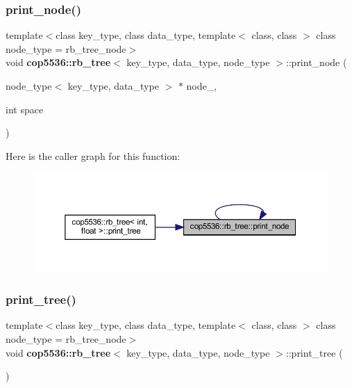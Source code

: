 \mbox{\label{classcop5536_1_1rb__tree_a81f5e4b5a9189799bbc0badcc6ecdc93}} 
\subsubsection{print\_node()}
{\footnotesize\ttfamily template$<$class key\+\_\+type, class data\+\_\+type, template$<$ class, class $>$ class node\+\_\+type = rb\+\_\+tree\+\_\+node$>$ \\
void \textbf{ cop5536\+::rb\+\_\+tree}$<$ key\+\_\+type, data\+\_\+type, node\+\_\+type $>$\+::print\+\_\+node (\begin{DoxyParamCaption}\item[{node\+\_\+type$<$ key\+\_\+type, data\+\_\+type $>$ $\ast$}]{node\+\_\+,  }\item[{int}]{space }\end{DoxyParamCaption})\hspace{0.3cm}{\ttfamily [inline]}}

Here is the caller graph for this function\+:
\nopagebreak
\begin{figure}[H]
\begin{center}
\leavevmode
\includegraphics[width=350pt]{classcop5536_1_1rb__tree_a81f5e4b5a9189799bbc0badcc6ecdc93_icgraph}
\end{center}
\end{figure}
\mbox{\label{classcop5536_1_1rb__tree_ae549cd20bdc369bf29acfc543ecdb3a5}} 
\subsubsection{print\_tree()}
{\footnotesize\ttfamily template$<$class key\+\_\+type, class data\+\_\+type, template$<$ class, class $>$ class node\+\_\+type = rb\+\_\+tree\+\_\+node$>$ \\
void \textbf{ cop5536\+::rb\+\_\+tree}$<$ key\+\_\+type, data\+\_\+type, node\+\_\+type $>$\+::print\+\_\+tree (\begin{DoxyParamCaption}{ }\end{DoxyParamCaption})\hspace{0.3cm}{\ttfamily [inline]}}

